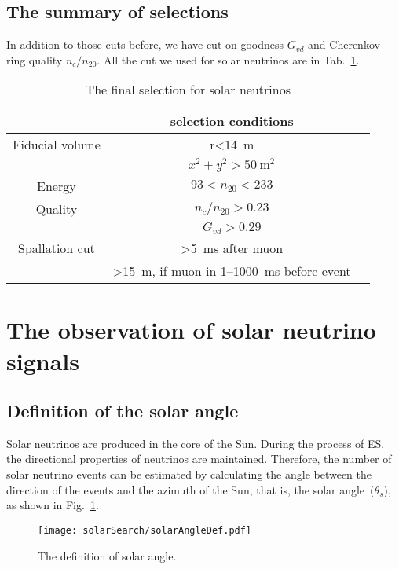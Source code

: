 \subsection{The summary of selections}
In addition to those cuts before, we have cut on goodness $G_{vd}$ and Cherenkov ring quality $n_c/n_{20}$. All the cut we used for solar neutrinos are in Tab.~\ref{tab:selection_summary}.
\begin{table}[htbp]
	\centering
	\caption{The final selection for solar neutrinos}%
	\label{tab:selection_summary}
	\begin{tabular}{ccc}
		\toprule
		                & selection conditions                                  \\
		\midrule
		Fiducial volume & r<\SI{14}{m}                                          \\
		                & $x^2+y^2>50~\text{m}^2$                               \\
		Energy          & $93<n_{20}<233$                                       \\
		Quality         & $n_c/n_{20}>0.23$                                     \\
		                & $G_{vd}>0.29$                                         \\
		Spallation cut  & >\SI{5}{ms} after muon                                \\
		                & >\SI{15}{m}, if muon in 1--\SI{1000}{ms} before event \\
		\bottomrule
	\end{tabular}
\end{table}

\section{The observation of solar neutrino signals}
\subsection{Definition of the solar angle}
Solar neutrinos are produced in the core of the Sun. During the process of ES, the directional properties of neutrinos are maintained. Therefore, the number of solar neutrino events can be estimated by calculating the angle between the direction of the events and the azimuth of the Sun, that is, the solar angle~($\theta_s$), as shown in Fig.~\ref{fig:solar_angle_define}.
\begin{figure}[htbp]
	\centering
	\texttt{[image: solarSearch/solarAngleDef.pdf]}
	\caption{The definition of solar angle.}
	\label{fig:solar_angle_define}
\end{figure}
